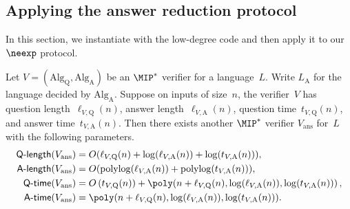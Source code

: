 \documentclass[11pt]{article}
\newcommand{\qtime}[1]{\mathsf{Q}\textnormal{-}\mathsf{time}(#1)}
\newcommand{\atime}[1]{\mathsf{A}\textnormal{-}\mathsf{time}(#1)}
\newcommand{\qlength}[1]{\mathsf{Q}\textnormal{-}\mathsf{length}(#1)}
\newcommand{\alength}[1]{\mathsf{A}\textnormal{-}\mathsf{length}(#1)}
\begin{document}
\subsection{Applying the answer reduction protocol}

In this section, we instantiate  with the low-degree code
and then apply it to our $\neexp$ protocol.

\begin{theorem}\label{thm:applied-with-low-degree-code}
Let $V = (\mathrm{Alg}_{\mathrm{Q}}, \mathrm{Alg}_{\mathrm{A}})$ be an $\MIP^*$ verifier for a language~$L$.
		Write $L_{\mathrm{A}}$ for the language decided by $\mathrm{Alg}_{\mathrm{A}}$.
		Suppose on inputs of size~$n$, the verifier~$V$ has question length~$\ell_{V,\mathrm{Q}}(n)$, answer length~$\ell_{V,\mathrm{A}}(n)$,
		question time~$t_{V,\mathrm{Q}}(n)$, and answer time~$t_{V,\mathrm{A}}(n)$.
		Then there exists another $\MIP^*$ verifier $V_{\mathrm{ans}}$ for~$L$ with the following parameters.
\begin{align*}
\qlength{V_{\mathrm{ans}}} &= O(\ell_{V, \mathrm{Q}}(n) + \log(\ell_{V,\mathrm{A}}(n))+ \log(t_{V, \mathrm{A}}(n))),\\
\alength{V_{\mathrm{ans}}} &= O(\mathrm{poly log}(\ell_{V, \mathrm{A}}(n)) + \mathrm{poly log}(t_{V, \mathrm{A}}(n))),\\
\qtime{V_{\mathrm{ans}}} &= O\left(t_{V,\mathrm{Q}}(n)) + \poly(n + \ell_{V, \mathrm{Q}}(n), \log(\ell_{V, \mathrm{A}}(n)), \log(t_{V, \mathrm{A}}(n))\right),\\
\atime{V_{\mathrm{ans}}} &= \poly(n + \ell_{V, \mathrm{Q}}(n), \log(\ell_{V, \mathrm{A}}(n)), \log(t_{V, \mathrm{A}}(n))).
\end{align*}
\end{theorem}
\end{document}
